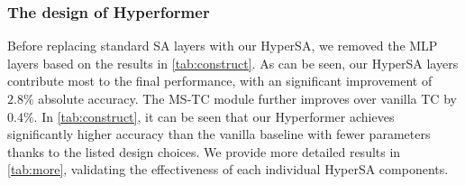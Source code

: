 \documentclass[10pt,twocolumn,letterpaper]{article}
\begin{document}


\subsubsection{The design of Hyperformer}
\label{sec:design}
Before replacing standard SA layers with our HyperSA, we removed the MLP layers based on the results in \cref{tab:construct}. As can be seen, our HyperSA layers contribute most to the final performance, with an significant improvement of $2.8\%$ absolute accuracy. The MS-TC module further improves over vanilla TC by $0.4\%$.
In \cref{tab:construct}, it can be seen that our Hyperformer achieves significantly higher accuracy than the vanilla baseline with fewer parameters thanks to the listed design choices. We provide more detailed results in \cref{tab:more}, validating the effectiveness of each individual HyperSA components. 
\end{document}
